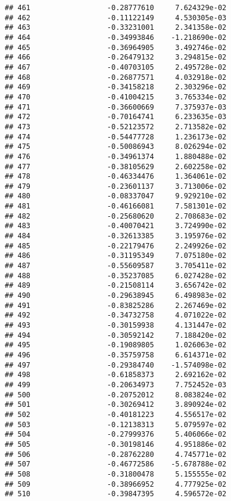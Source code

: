 \documentclass[
]{article}
\begin{document}
\begin{verbatim}
## 461                  -0.28777610     7.624329e-02
## 462                  -0.11122149     4.530305e-03
## 463                  -0.33231001     2.341358e-02
## 464                  -0.34993846    -1.218690e-02
## 465                  -0.36964905     3.492746e-02
## 466                  -0.26479132     3.294815e-02
## 467                  -0.40703105     2.495728e-02
## 468                  -0.26877571     4.032918e-02
## 469                  -0.34158218     2.303296e-02
## 470                  -0.41004215     3.765334e-02
## 471                  -0.36600669     7.375937e-03
## 472                  -0.70164741     6.233635e-03
## 473                  -0.52123572     2.713582e-02
## 474                  -0.54477728     1.236173e-02
## 475                  -0.50086943     8.026294e-02
## 476                  -0.34961374     1.880488e-02
## 477                  -0.38105629     2.602258e-02
## 478                  -0.46334476     1.364061e-02
## 479                  -0.23601137     3.713006e-02
## 480                  -0.08337047     9.929210e-02
## 481                  -0.46166081     7.581301e-02
## 482                  -0.25680620     2.708683e-02
## 483                  -0.40070421     3.724990e-02
## 484                  -0.32613385     3.195976e-02
## 485                  -0.22179476     2.249926e-02
## 486                  -0.31195349     7.075180e-02
## 487                  -0.55609587     3.705411e-02
## 488                  -0.35237085     6.027428e-02
## 489                  -0.21508114     3.656742e-02
## 490                  -0.29638945     6.498983e-02
## 491                  -0.83825286     2.267469e-02
## 492                  -0.34732758     4.071022e-02
## 493                  -0.30159938     4.131447e-02
## 494                  -0.30592142     7.188420e-02
## 495                  -0.19089805     1.026063e-02
## 496                  -0.35759758     6.614371e-02
## 497                  -0.29384740    -1.574098e-02
## 498                  -0.61858373     2.692162e-02
## 499                  -0.20634973     7.752452e-03
## 500                  -0.20752012     8.083824e-02
## 501                  -0.30269412     3.890924e-02
## 502                  -0.40181223     4.556517e-02
## 503                  -0.12138313     5.079597e-02
## 504                  -0.27999376     5.406066e-02
## 505                  -0.30198146     4.951886e-02
## 506                  -0.28762280     4.745771e-02
## 507                  -0.46772586    -5.678788e-02
## 508                  -0.31800478     5.155555e-02
## 509                  -0.38966952     4.777925e-02
## 510                  -0.39847395     4.596572e-02

\end{verbatim}
\end{document}
